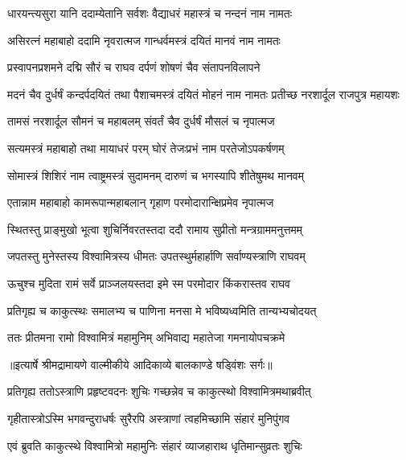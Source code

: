 \twolineshloka
{धारयन्त्यसुरा यानि ददाम्येतानि सर्वशः}
{वैद्याधरं महास्त्रं च नन्दनं नाम नामतः} %

\twolineshloka
{असिरत्नं महाबाहो ददामि नृवरात्मज}
{गान्धर्वमस्त्रं दयितं मानवं नाम नामतः} %

\twolineshloka
{प्रस्वापनप्रशमने दद्मि सौरं च राघव}
{दर्पणं शोषणं चैव संतापनविलापने} %

\threelineshloka
{मदनं चैव दुर्धर्षं कन्दर्पदयितं तथा}
{पैशाचमस्त्रं दयितं मोहनं नाम नामतः}
{प्रतीच्छ नरशार्दूल राजपुत्र महायशः} %

\twolineshloka
{तामसं नरशार्दूल सौमनं च महाबलम्}
{संवर्तं चैव दुर्धर्षं मौसलं च नृपात्मज} %

\twolineshloka
{सत्यमस्त्रं महाबाहो तथा मायाधरं परम्}
{घोरं तेजःप्रभं नाम परतेजोऽपकर्षणम्} %

\twolineshloka
{सोमास्त्रं शिशिरं नाम त्वाष्ट्रमस्त्रं सुदामनम्}
{दारुणं च भगस्यापि शीतेषुमथ मानवम्} %

\twolineshloka
{एतान्नाम महाबाहो कामरूपान्महाबलान्}
{गृहाण परमोदारान्क्षिप्रमेव नृपात्मज} %

\twolineshloka
{स्थितस्तु प्राङ्मुखो भूत्वा शुचिर्निवरतस्तदा}
{ददौ रामाय सुप्रीतो मन्त्रग्राममनुत्तमम्} %

\twolineshloka
{जपतस्तु मुनेस्तस्य विश्वामित्रस्य धीमतः}
{उपतस्थुर्महार्हाणि सर्वाण्यस्त्राणि राघवम्} %

\twolineshloka
{ऊचुश्च मुदिता रामं सर्वे प्राञ्जलयस्तदा}
{इमे स्म परमोदार किंकरास्तव राघव} %

\twolineshloka
{प्रतिगृह्य च काकुत्स्थः समालभ्य च पाणिना}
{मनसा मे भविष्यध्वमिति तान्यभ्यचोदयत्} %

\twolineshloka
{ततः प्रीतमना रामो विश्वामित्रं महामुनिम्}
{अभिवाद्य महातेजा गमनायोपचक्रमे} %


{॥इत्यार्षे श्रीमद्रामायणे वाल्मीकीये आदिकाव्ये बालकाण्डे षड्विंशः सर्गः॥}


\twolineshloka
{प्रतिगृह्य ततोऽस्त्राणि प्रहृष्टवदनः शुचिः}
{गच्छन्नेव च काकुत्स्थो विश्वामित्रमथाब्रवीत्} %

\twolineshloka
{गृहीतास्त्रोऽस्मि भगवन्दुराधर्षः सुरैरपि}
{अस्त्राणां त्वहमिच्छामि संहारं मुनिपुंगव} %

\twolineshloka
{एवं ब्रुवति काकुत्स्थे विश्वामित्रो महामुनिः}
{संहारं व्याजहाराथ धृतिमान्सुव्रतः शुचिः} %

